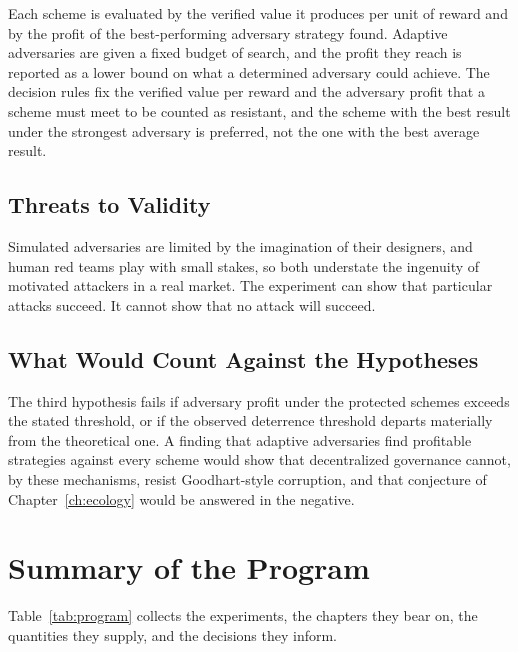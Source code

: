 Each scheme is evaluated by the verified value it produces per unit of reward and by the profit of the best-performing adversary strategy found. Adaptive adversaries are given a fixed budget of search, and the profit they reach is reported as a lower bound on what a determined adversary could achieve. The decision rules fix the verified value per reward and the adversary profit that a scheme must meet to be counted as resistant, and the scheme with the best result under the strongest adversary is preferred, not the one with the best average result.

\subsection*{Threats to Validity}

Simulated adversaries are limited by the imagination of their designers, and human red teams play with small stakes, so both understate the ingenuity of motivated attackers in a real market. The experiment can show that particular attacks succeed. It cannot show that no attack will succeed.

\subsection*{What Would Count Against the Hypotheses}

The third hypothesis fails if adversary profit under the protected schemes exceeds the stated threshold, or if the observed deterrence threshold departs materially from the theoretical one. A finding that adaptive adversaries find profitable strategies against every scheme would show that decentralized governance cannot, by these mechanisms, resist Goodhart-style corruption, and that conjecture of Chapter~\ref{ch:ecology} would be answered in the negative.

\section{Summary of the Program}

Table~\ref{tab:program} collects the experiments, the chapters they bear on, the quantities they supply, and the decisions they inform.

